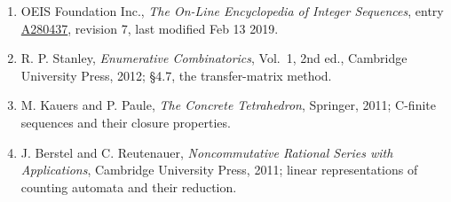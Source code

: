 \documentclass[11pt]{article}
\theoremstyle{definition}
\begin{document}
\begin{enumerate}

\item OEIS Foundation Inc., \emph{The On-Line Encyclopedia of Integer Sequences}, entry \href{https://oeis.org/A280437}{A280437}, revision 7, last modified Feb 13 2019.

\item R. P. Stanley, \emph{Enumerative Combinatorics}, Vol.~1, 2nd ed., Cambridge University Press, 2012; \S4.7, the transfer-matrix method.

\item M. Kauers and P. Paule, \emph{The Concrete Tetrahedron}, Springer, 2011; C-finite sequences and their closure properties.

\item J. Berstel and C. Reutenauer, \emph{Noncommutative Rational Series with Applications}, Cambridge University Press, 2011; linear representations of counting automata and their reduction.

\end{enumerate}
\end{document}
